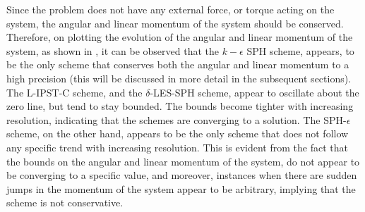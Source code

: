Since the problem does not have any external force, or torque acting on the system, the angular and linear momentum of the system should be conserved.
Therefore, on plotting the evolution of the angular and linear momentum of the system, as shown in , it can be observed that the $k-\epsilon$ SPH scheme, appears, to be the only scheme that conserves both the angular and linear momentum to a high precision (this will be discussed in more detail in the subsequent sections). The L-IPST-C scheme, and the $\delta$-LES-SPH scheme, appear to oscillate about the zero line, but tend to stay bounded. The bounds become tighter with increasing resolution, indicating that the schemes are converging to a solution.
The SPH-$\epsilon$ scheme, on the other hand, appears to be the only scheme that does not follow any specific trend with increasing resolution. This is evident from the fact that the bounds on the angular and linear momentum of the system, do not appear to be converging to a specific value, and moreover, instances when there are sudden jumps in the momentum of the system appear to be arbitrary, implying that the scheme is not conservative.

